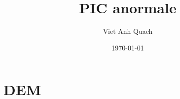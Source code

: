 \documentclass[9pt]{beamer}
\title{PIC anormale}
\author{Viet Anh Quach}
\institute{3SR}
\date{\today}
\begin{document}
\section{DEM}

\end{document}
